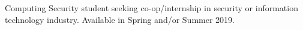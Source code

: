 

\begin{cvparagraph}

Computing Security student seeking co-op/internship in security or information
technology industry. Available in Spring and/or Summer 2019. 
\end{cvparagraph}
